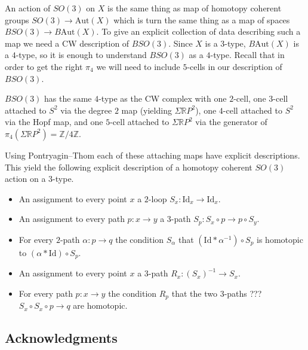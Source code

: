 \documentclass{amsart}
\begin{document}
An action of $SO(3)$ on $X$ is the same thing as map of homotopy coherent groups $SO(3) \rightarrow \mathrm{Aut}(X)$ which is turn the same thing as a map of spaces $BSO(3) \rightarrow B\mathrm{Aut}(X)$.  To give an explicit collection of data describing such a map we need a CW description of $BSO(3)$.  Since $X$ is a $3$-type, $B\mathrm{Aut}(X)$ is a $4$-type, so it is enough to understand $BSO(3)$ as a $4$-type.  Recall that in order to get the right $\pi_4$ we will need to include $5$-cells in our description of $BSO(3)$.

\begin{theorem}
$BSO(3)$ has the same $4$-type as the CW complex with one $2$-cell, one $3$-cell attached to $S^2$ via the degree $2$ map (yielding $\Sigma \mathbb{R}P^2$), one $4$-cell attached to $S^2$ via the Hopf map, and one $5$-cell attached to $\Sigma \mathbb{R}P^2$ via the generator of $\pi_4(\Sigma \mathbb{R}P^2) = \mathbb{Z}/4\mathbb{Z}$.
\end{theorem}

Using Pontryagin--Thom each of these attaching maps have explicit descriptions.  This yield the following explicit description of a homotopy coherent $SO(3)$ action on a $3$-type.

\begin{itemize}
\item An assignment to every point $x$ a $2$-loop $S_x: \mathrm{Id}_x \rightarrow \mathrm{Id}_x$.
\item An assignment to every path $p:x \rightarrow y$ a $3$-path $S_p: S_x \circ p \rightarrow p \circ S_y$.
\item For every $2$-path $\alpha: p \rightarrow q$ the condition $S_\alpha$ that $(\mathrm{Id} \ast \alpha^{-1}) \circ S_p$ is homotopic to $(\alpha \ast \mathrm{Id}) \circ S_p$.
\end{itemize}

\begin{itemize}
\item An assignment to every point $x$ a $3$-path $R_x: (S_x)^{-1}  \rightarrow S_x$.
\item For every path $p: x \rightarrow y$ the condition $R_p$ that the two $3$-paths ??? $S_x \circ S_x \circ p \rightarrow q$ are homotopic.
\end{itemize}

\subsection*{Acknowledgments}
\end{document}

